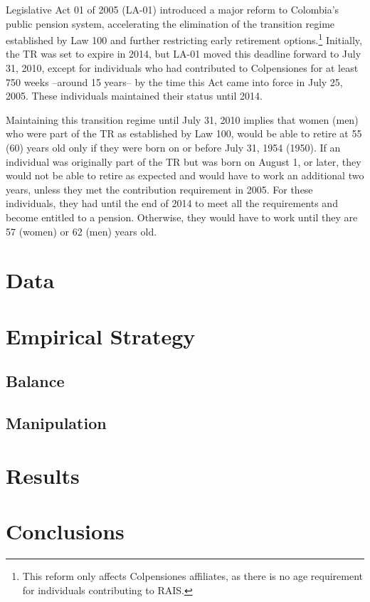 \documentclass[12pt, a4paper]{article}
\begin{document}
Legislative Act 01 of 2005 (LA-01) introduced a major reform to Colombia’s public pension system, accelerating the elimination of the transition regime established by Law 100 and further restricting early retirement options.\footnote{This reform only affects Colpensiones affiliates, as there is no age requirement for individuals contributing to RAIS.} Initially, the TR was set to expire in 2014, but LA-01 moved this deadline forward to July 31, 2010, except for individuals who had contributed to Colpensiones for at least 750 weeks --around 15 years-- by the time this Act came into force in July 25, 2005. These individuals maintained their status until 2014.

Maintaining this transition regime until July 31, 2010 implies that women (men) who were part of the TR as established by Law 100, would be able to retire at 55 (60) years old only if they were born on or before July 31, 1954 (1950). If an individual was originally part of the TR but was born on August 1, or later, they would not be able to retire as expected and would have to work an additional two years, unless they met the contribution requirement in 2005. For these individuals, they had until the end of 2014 to meet all the requirements and become entitled to a pension. Otherwise, they would have to work until they are 57 (women) or 62 (men) years old.




\section{Data \label{sec:data}}



\section{Empirical Strategy \label{sec:strategy}}

\subsection{Balance}

\subsection{Manipulation}

\section{Results}


\section{Conclusions}

\newpage


\end{document}
